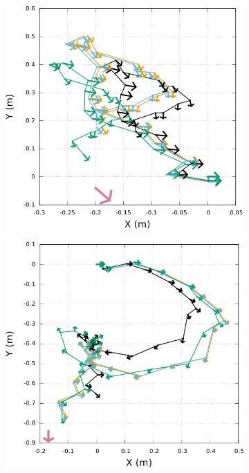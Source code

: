 \begin{figure}[h]
\begin{subfigure}{0.28\paperwidth}
    \end{subfigure}
    \newline
    \begin{subfigure}{0.28\paperwidth}
        \centering
        \includegraphics[type=pdf,ext=.pdf,read=.pdf,width=1.0\linewidth]{../plot/OdometryCMAES/readsTraj7}
    \end{subfigure}
    \begin{subfigure}{0.28\paperwidth}
        \centering
        \includegraphics[type=pdf,ext=.pdf,read=.pdf,width=1.0\linewidth]{../plot/OdometryCMAES/readsTraj8}

\end{subfigure}
\end{figure}
